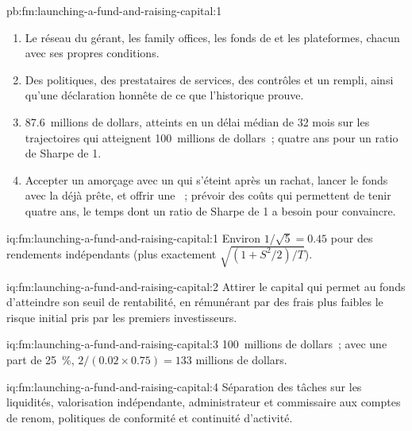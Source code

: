 \begin{solution}{pb:fm:launching-a-fund-and-raising-capital:1}
\begin{enumerate}
\item Le réseau du gérant, les family offices, les fonds de  et les plateformes, chacun avec ses propres conditions.
\item Des politiques, des prestataires de services, des contrôles et un  rempli, ainsi qu'une déclaration honnête de ce que l'historique prouve.
\item 87.6~millions de dollars, atteints en un délai médian de 32 mois sur les trajectoires qui atteignent 100~millions de dollars~; quatre ans pour un ratio de Sharpe de 1.
\item Accepter un amorçage avec un  qui s'éteint après un rachat, lancer le fonds avec la  déjà prête, et offrir une ~; prévoir des coûts qui permettent de tenir quatre ans, le temps dont un ratio de Sharpe de 1 a besoin pour convaincre.
\end{enumerate}
\end{solution}

\begin{solution}{iq:fm:launching-a-fund-and-raising-capital:1}
Environ $1/\sqrt5=0.45$ pour des rendements indépendants (plus exactement $\sqrt{(1+S^2/2)/T}$).
\end{solution}

\begin{solution}{iq:fm:launching-a-fund-and-raising-capital:2}
Attirer le capital qui permet au fonds d'atteindre son seuil de rentabilité, en rémunérant par des frais plus faibles le risque initial pris par les premiers investisseurs.
\end{solution}

\begin{solution}{iq:fm:launching-a-fund-and-raising-capital:3}
100~millions de dollars~; avec une part de 25~\%, $2/(0.02\times0.75)=133$ millions de dollars.
\end{solution}

\begin{solution}{iq:fm:launching-a-fund-and-raising-capital:4}
Séparation des tâches sur les liquidités, valorisation indépendante, administrateur et commissaire aux comptes de renom, politiques de conformité et continuité d'activité.
\end{solution}

